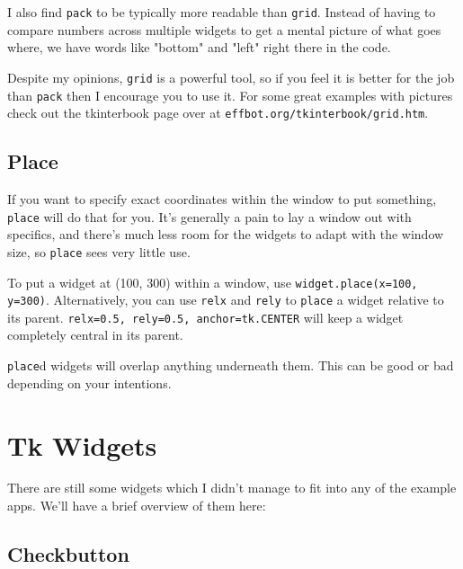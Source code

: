 \documentclass[a4paper,11pt,openany]{book}
\begin{document}
I also find \lstinline[columns=fixed]{pack} to be typically more readable than \lstinline[columns=fixed]{grid}. Instead of having to compare numbers across multiple widgets to get a mental picture of what goes where, we have words like "bottom" and "left" right there in the code. 

\vspace{5mm}

Despite my opinions, \lstinline[columns=fixed]{grid} is a powerful tool, so if you feel it is better for the job than \lstinline[columns=fixed]{pack} then I encourage you to use it. For some great examples with pictures check out the tkinterbook page over at \lstinline[columns=fixed]{effbot.org/tkinterbook/grid.htm}. 

\subsection{Place}

If you want to specify exact coordinates within the window to put something, \lstinline[columns=fixed]{place} will do that for you. It's generally a pain to lay a window out with specifics, and there's much less room for the widgets to adapt with the window size, so \lstinline[columns=fixed]{place} sees very little use. 

\vspace{5mm}

To put a widget at (100, 300) within a window, use \lstinline[columns=fixed]{widget.place(x=100, y=300)}. Alternatively, you can use \lstinline[columns=fixed]{relx} and \lstinline[columns=fixed]{rely} to \lstinline[columns=fixed]{place} a widget relative to its parent. \lstinline[columns=fixed]{relx=0.5, rely=0.5, anchor=tk.CENTER} will keep a widget completely central in its parent. 

\vspace{5mm}

\lstinline[columns=fixed]{place}d widgets will overlap anything underneath them. This can be good or bad depending on your intentions.

\section{Tk Widgets}

There are still some widgets which I didn't manage to fit into any of the example apps. We'll have a brief overview of them here:

\subsection{Checkbutton}
\end{document}
